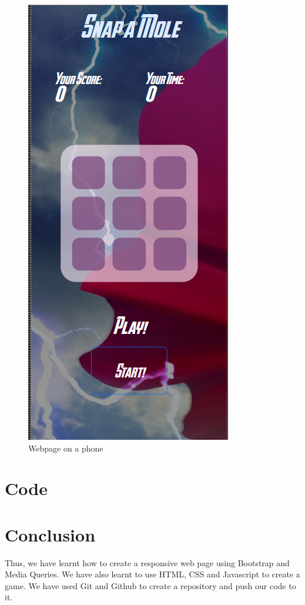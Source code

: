 \documentclass[11pt]{article}
\begin{document}
\begin{figure}[H]
    \centering
    \includegraphics[height=.95\textwidth]{smol.png}
    \caption{Webpage on a phone}
\end{figure}

\section{Code}



\section{Conclusion}
Thus, we have learnt how to create a responsive web page using Bootstrap and Media Queries. We have also learnt to use HTML, CSS and Javascript to create a game. We have used Git and Github to create a repository and push our code to it.
\clearpage
\end{document}
